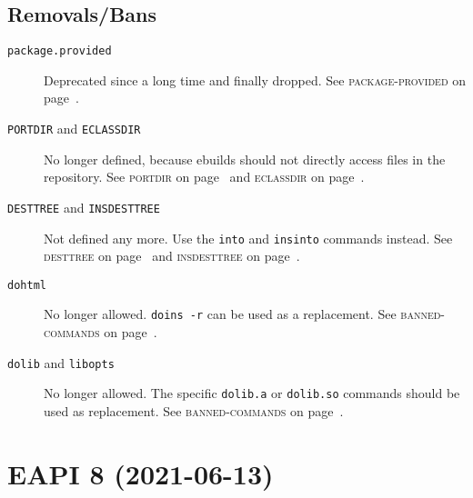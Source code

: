 \documentclass[a4paper,nofoldmark]{leaflet}
\newcommand{\code}[1]{\texttt{#1}}
\newcommand{\featureref}[1]{\textsc{#1} on page~\pageref{feat:#1}}
\begin{document}
\subsection{Removals/Bans}
\label{sec:cs:eapi7-removalsbans}
\begin{description}
    \item[\code{package.provided}] Deprecated since a long time and
    finally dropped.
    See \featureref{package-provided}.
    \item[\code{PORTDIR} and \code{ECLASSDIR}] No longer defined,
    because ebuilds should not directly access files in the repository.
    See \featureref{portdir} and \featureref{eclassdir}.
    \item[\code{DESTTREE} and \code{INSDESTTREE}] Not defined any
    more. Use the \code{into} and \code{insinto} commands instead.
    See \featureref{desttree} and \featureref{insdesttree}.
    \item[\code{dohtml}] No longer allowed. \code{doins -r} can be
    used as a replacement.
    See \featureref{banned-commands}.
    \item[\code{dolib} and \code{libopts}] No longer allowed.
    The specific \code{dolib.a} or \code{dolib.so} commands should be
    used as replacement.
    See \featureref{banned-commands}.
\end{description}

\section{EAPI 8 (2021-06-13)}
\label{sec:cs:eapi8}
\end{document}
